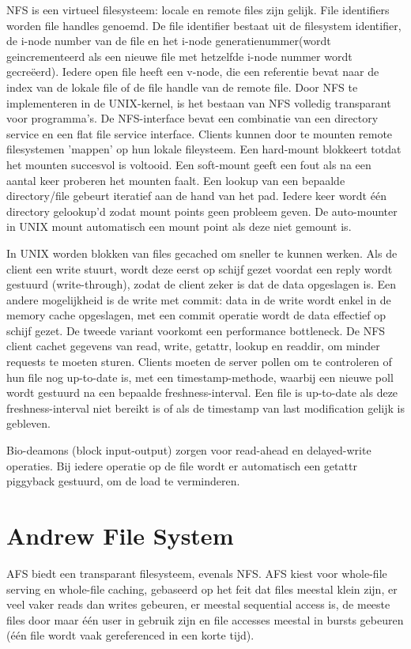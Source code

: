 \documentclass[../samenvatting.tex]{subfiles}
\begin{document}
NFS is een virtueel filesysteem: locale en remote files zijn gelijk. File identifiers worden file handles genoemd. De file identifier bestaat uit de filesystem identifier, de i-node number van de file en het i-node generatienummer(wordt geincrementeerd als een nieuwe file met hetzelfde i-node nummer wordt gecreëerd). Iedere open file heeft een v-node, die een referentie bevat naar de index van de lokale file of de file handle van de remote file. Door NFS te implementeren in de UNIX-kernel, is het bestaan van NFS volledig transparant voor programma's. De NFS-interface bevat een combinatie van een directory service en een flat file service interface. Clients kunnen door te mounten remote filesystemen 'mappen' op hun lokale fileysteem. Een hard-mount blokkeert totdat het mounten succesvol is voltooid. Een soft-mount geeft een fout als na een aantal keer proberen het mounten faalt. Een lookup van een bepaalde directory/file gebeurt iteratief aan de hand van het pad. Iedere keer wordt één directory gelookup'd zodat mount points geen probleem geven. De auto-mounter in UNIX mount automatisch een mount point als deze niet gemount is.

In UNIX worden blokken van files gecached om sneller te kunnen werken. Als de client een write stuurt, wordt deze eerst op schijf gezet voordat een reply wordt gestuurd (write-through), zodat de client zeker is dat de data opgeslagen is. Een andere mogelijkheid is de write met commit: data in de write wordt enkel in de memory cache opgeslagen, met een commit operatie wordt de data effectief op schijf gezet. De tweede variant voorkomt een performance bottleneck. De NFS client cachet gegevens van read, write, getattr, lookup en readdir, om minder requests te moeten sturen. Clients moeten de server pollen om te controleren of hun file nog up-to-date is, met een timestamp-methode, waarbij een nieuwe poll wordt gestuurd na een bepaalde freshness-interval. Een file is up-to-date als deze freshness-interval niet bereikt is of als de timestamp van last modification gelijk is gebleven. 

Bio-deamons (block input-output) zorgen voor read-ahead en delayed-write operaties. Bij iedere operatie op de file wordt er automatisch een getattr piggyback gestuurd, om de load te verminderen. 

\section{Andrew File System}

AFS biedt een transparant filesysteem, evenals NFS. AFS kiest voor whole-file serving en whole-file caching, gebaseerd op het feit dat files meestal klein zijn, er veel vaker reads dan writes gebeuren, er meestal sequential access is, de meeste files door maar één user in gebruik zijn en file accesses meestal in bursts gebeuren (één file wordt vaak gereferenced in een korte tijd). 
\end{document}
